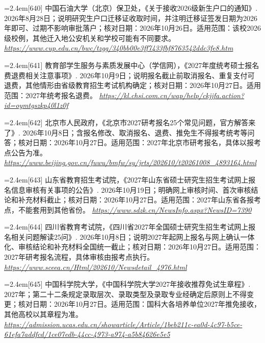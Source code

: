 \par\noindent\hangindent=2.4em\label{src:S0786}{\color{cAccent}[640]} 中国石油大学（北京）保卫处，《关于接收2026级新生户口的通知》. 2026年8月28日；说明研究生户口迁移证收取时间，并注明迁移证签发日期为2026年即可、过期不影响审批落户；核对日期：2026年10月26日。适用范围：该校2026级校例，其他迁入地公安机关和学校可能有不同要求。 \textit{\url{https://www.cup.edu.cn/bwc/tzgg/340bb00e3ff7433fbf8763542ddc3fe8.htm}}\par
\par\noindent\hangindent=2.4em\label{src:S0787}{\color{cAccent}[641]} 教育部学生服务与素质发展中心（学信网），《2027年度统考硕士报名费退费相关注意事项》. 2026年10月9日；说明报名截止前取消报名、重复支付可退费，其他情形由省级教育招生考试机构确定；核对日期：2026年10月27日。适用范围：2027年统考报名退费。 \textit{\url{https://kl.chsi.com.cn/wap/help/ckjjfa.action?id=oymtgszkp40l1z0f}}\par
\par\noindent\hangindent=2.4em\label{src:S0788}{\color{cAccent}[642]} 北京市人民政府，《北京市2027研考报名25个常见问题，官方解答来了》. 2026年10月8日；含报名修改、取消报名、退费、推免生不得报考统考等问答；核对日期：2026年10月27日。适用范围：2027年北京市研考报名，具体以报考点公告为准。 \textit{\url{https://www.beijing.gov.cn/fuwu/bmfw/sy/jrts/202610/t20261008_4893164.html}}\par
\par\noindent\hangindent=2.4em\label{src:S0789}{\color{cAccent}[643]} 山东省教育招生考试院，《2027年山东省硕士研究生招生考试网上报名信息审核有关事项的公告》. 2026年10月19日；明确网上审核时间、首次审核结论和补充材料截止；核对日期：2026年10月27日。适用范围：2027年山东省各报考点，不能套用到其他省份。 \textit{\url{https://www.sdzk.cn/NewsInfo.aspx?NewsID=7390}}\par
\par\noindent\hangindent=2.4em\label{src:S0790}{\color{cAccent}[644]} 四川省教育考试院，《四川省2027年全国硕士研究生招生考试网上报名相关问题解读25问》. 2026年10月8日；说明2027年起网上报名与网上确认一体化、审核结论和补充材料全国统一截止；核对日期：2026年10月27日。适用范围：2027年研考报名流程，具体审核由报考点执行。 \textit{\url{https://www.sceea.cn/Html/202610/Newsdetail_4976.html}}\par
\par\noindent\hangindent=2.4em\label{src:S0791}{\color{cAccent}[645]} 中国科学院大学，《中国科学院大学2027年接收推荐免试生章程》. 2027年；第二十二条规定录取层次、录取类型及录取专业经确定后原则上不得变更；核对日期：2026年10月27日。适用范围：国科大各培养单位2027年推免接收，其他高校以其章程为准。 \textit{\url{https://admission.ucas.edu.cn/showarticle/Article/1beb211c-ea0d-4c97-b5ce-61efa7addfcd/1ce07edb-44cc-4973-a974-a5b84626e5e5}}\par
